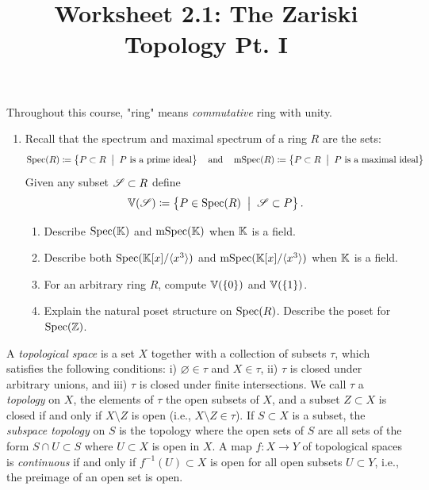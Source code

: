 \documentclass[12pt,reqno]{amsart}
\title{Worksheet 2.1: The Zariski Topology Pt. I}
\begin{document}

\maketitle
\thispagestyle{firstpage}

Throughout this course, "ring" means  \textit{commutative} ring with unity.
 
 \hrulefill 

\begin{enumerate}[leftmargin=*]
\item Recall that the spectrum and maximal spectrum of a ring $R$ are the sets:
\[
\operatorname{Spec}(R) \coloneqq\left\{ P \subset R \;\; \big|\;\; \text{$P$ is a prime ideal}\right\}  \quad \text{and}  \quad
\operatorname{mSpec}(R) \coloneqq\left\{ P \subset R \;\; \big|\;\; \text{$P$ is a maximal ideal}\right\} 
\]
Given any subset $\mathcal{S} \subset R$ define 
\[
\mathbb{V}(\mathcal{S}) \coloneqq \left\{P \in \operatorname{Spec}(R) \;\; \big| \;\; \mathcal{S} \subset P\right \}.
\]
\begin{enumerate}[label=(\alph*),ref=\theenumi\alph*]
	\item Describe $\operatorname{Spec}(\mathbb{K})$ and $\operatorname{mSpec}(\mathbb{K})$ when $\mathbb{K}$ is a field. 
	\item Describe both $\operatorname{Spec}(\mathbb{K}[x]/\langle x^{3}\rangle)$ and $\operatorname{mSpec}(\mathbb{K}[x]/\langle x^{3}\rangle)$ when $\mathbb{K}$ is a field. 
	\item For an arbitrary ring $R$, compute $\mathbb{V}(\{0\})$ and $\mathbb{V}(\{1\})$. 
	\item Explain the natural poset structure on $\operatorname{Spec}(R)$. Describe the poset for $\operatorname{Spec}(\mathbb{Z})$. 
\end{enumerate}
\end{enumerate}

\hrulefill

A \emph{topological space} is a set $X$ together with a collection of subsets $\tau$, which satisfies the following conditions: i) $\varnothing \in \tau$ and $X \in \tau$, ii) $\tau$ is closed under arbitrary unions, and iii) $\tau$ is closed under finite intersections. We call $\tau$ a \emph{topology} on $X$, the elements of $\tau$ the open subsets of $X$, and a subset $Z \subset X$ is closed if and only if $X\setminus Z$ is open (i.e., $X \setminus Z \in \tau$). If $S \subset X$ is a subset, the \emph{subspace topology} on $S$ is the topology where the open sets of $S$ are all sets of the form $S \cap U \subset S$ where $U \subset X$ is open in $X$. A map $f: X \to Y$ of topological spaces is \emph{continuous} if and only if $f^{-1}(U) \subset X$ is open for all open subsets $U \subset Y$, i.e., the preimage of an open set is open. 
\end{document}
